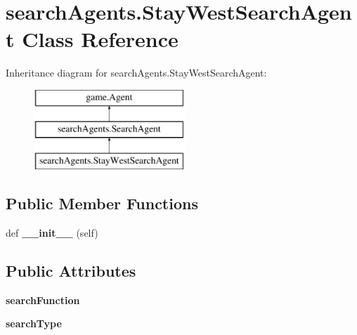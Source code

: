 \hypertarget{classsearch_agents_1_1_stay_west_search_agent}{}\section{search\+Agents.\+Stay\+West\+Search\+Agent Class Reference}
\label{classsearch_agents_1_1_stay_west_search_agent}
Inheritance diagram for search\+Agents.\+Stay\+West\+Search\+Agent\+:\begin{figure}[H]
\begin{center}
\leavevmode
\includegraphics[height=3.000000cm]{classsearch_agents_1_1_stay_west_search_agent}
\end{center}
\end{figure}
\subsection*{Public Member Functions}
\begin{DoxyCompactItemize}
\item 
\mbox{\label{classsearch_agents_1_1_stay_west_search_agent_a2a222b3493fff4cc26f4705a926ce580}} 
def {\bfseries \+\_\+\+\_\+init\+\_\+\+\_\+} (self)
\end{DoxyCompactItemize}
\subsection*{Public Attributes}
\begin{DoxyCompactItemize}
\item 
\mbox{\label{classsearch_agents_1_1_stay_west_search_agent_ac44b94be3b7571440773fb38899ce6db}} 
{\bfseries search\+Function}
\item 
\mbox{\label{classsearch_agents_1_1_stay_west_search_agent_a5d1b6647ecf29ab11a779da574ff327c}} 
{\bfseries search\+Type}
\end{DoxyCompactItemize}


